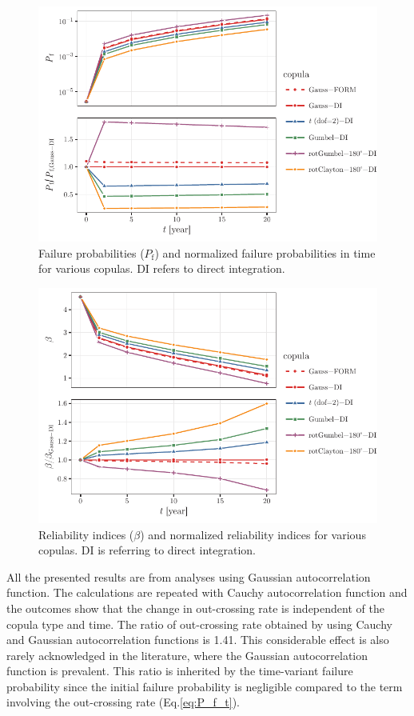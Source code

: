 \begin{figure}[htbp!] 
	\centering    
	\includegraphics[]{Sudrets_beam_log_Pf.pdf}
	\caption{Failure probabilities ($P_\mathrm{f}$) and normalized failure probabilities in time for various copulas. DI refers to direct integration.}
	\label{fig:Pf_ex2}
\end{figure}

\begin{figure}[htbp!] 
	\centering    
	\includegraphics[]{Sudrets_beam_beta.pdf}
	\caption{Reliability indices ($\beta$) and normalized reliability indices for various copulas. DI is referring to direct integration.}
	\label{fig:beta_ex2}
\end{figure}

All the presented results are from analyses using Gaussian autocorrelation function. The calculations are repeated with Cauchy autocorrelation function and the outcomes show that the change in out-crossing rate is independent of the copula type and time. The ratio of out-crossing rate obtained by using Cauchy and Gaussian autocorrelation functions is 1.41. This considerable effect is also rarely acknowledged in the literature, where the Gaussian autocorrelation function is prevalent. This ratio is inherited by the time-variant failure probability since the initial failure probability is negligible compared to the term involving the out-crossing rate (Eq.\ref{eq:P_f_t}).


